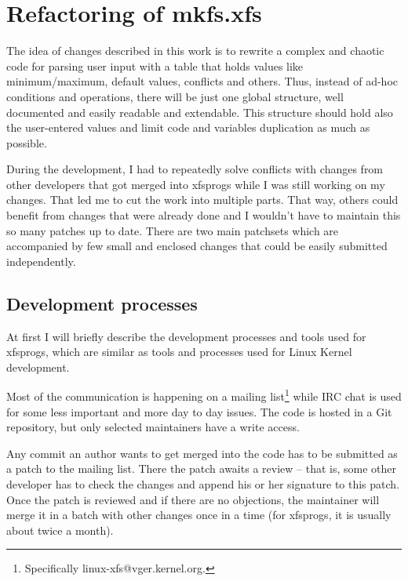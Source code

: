 
\chapter{Refactoring of mkfs.xfs} \label{chap:refactoring}

The idea of changes described in this work is to rewrite a complex and
chaotic code for parsing user input with a table that holds values like
minimum/maximum, default values, conflicts and others. Thus, instead of
ad-hoc conditions and operations, there will be just one global structure,
well documented and easily readable and extendable. This structure should
hold also the user-entered values and limit code and variables duplication
as much as possible.

During the development, I had to repeatedly solve conflicts with changes
from other developers that got merged into xfsprogs while I was still
working on my changes. That led me to cut the work into multiple parts.
That way, others could benefit from changes that were already done and I
wouldn't have to maintain this so many patches up to date. There are two
main patchsets which are accompanied by few small and enclosed changes that
could be easily submitted independently.

\section{Development processes}\label{chap:refactoring:processes}

At first I will briefly describe the development processes and tools used for
xfsprogs, which are similar as tools and processes used for Linux Kernel
development.

Most of the communication is happening on a mailing
list\footnote{Specifically linux-xfs@vger.kernel.org.} while IRC chat is
used for some less
important and more day to day issues. The code is hosted in a Git repository,
but only selected maintainers have a write access.

Any commit an author wants to get merged into the code has to be submitted
as a patch to the mailing list. There the patch awaits a review -- that is,
some other developer has to check the changes and append his or her
signature to this patch. Once the patch is reviewed and if there are no
objections, the maintainer will merge it in a batch with other changes once
in a time (for xfsprogs, it is usually about twice a month).

